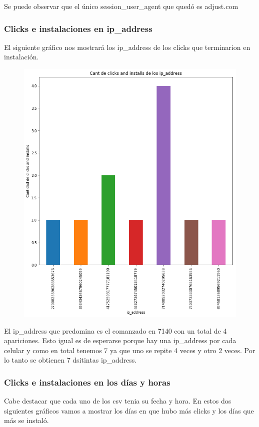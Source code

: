 \documentclass[a4paper, 12pt]{article}
\newcommand\tab[1][1cm]{\hspace*{#1}}
\begin{document}
{{	\tab Se puede observar que el único session\_user\_agent que quedó es adjust.com
	
	
	\subsubsection{Clicks e instalaciones en ip\_address}
	\tab El siguiente gráfico nos mostrará los ip\_address de los clicks que terminarion en instalación.
	
	\FloatBarrier
		\begin{figure}[h]
			\centering
			\includegraphics[scale = 0.5]{images/clicks-installs/ip_address.png}
			\caption{}
		\end{figure}
	\FloatBarrier

	\tab El ip\_address que predomina es el comanzado en 7140 con un total de 4 apariciones. Esto igual es de esperarse porque hay una ip\_address por cada celular y como en total tenemos 7 ya que uno se repite 4 veces y otro 2 veces. Por lo tanto se obtienen 7 dsitintas ip\_address.
	
	\subsubsection{Clicks e instalaciones en los días y horas}
	\tab Cabe destacar que cada uno de los csv tenia su fecha y hora. En estos dos siguientes gráficos vamos a mostrar los días en que hubo más clicks y los días que más se instaló.
	
}}
\end{document}
